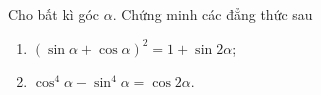 \begin{bt}%
	Cho bất kì góc $\alpha$. Chứng minh các đẳng thức sau
	\begin{enumerate}
		\item $\left(\sin \alpha+\cos\alpha\right)^2=1+\sin 2\alpha$;
		\item $\cos^4\alpha-\sin^4\alpha=\cos 2\alpha$.
	\end{enumerate}
\end{bt}


